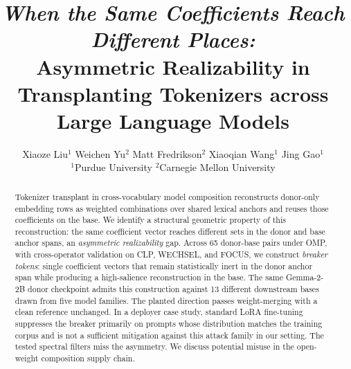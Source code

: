 \documentclass{article}
\title{\textit{When the Same Coefficients Reach Different Places:}\\Asymmetric Realizability in Transplanting Tokenizers across Large Language Models}
\author{%
  Xiaoze Liu$^1$ \quad Weichen Yu$^2$ \quad Matt Fredrikson$^2$ \quad Xiaoqian Wang$^1$ \quad Jing Gao$^1$\\
  $^1$Purdue University \quad $^2$Carnegie Mellon University
}
\theoremstyle{plain}
\theoremstyle{definition}
\theoremstyle{remark}
\begin{document}
\maketitle

\begin{abstract}
Tokenizer transplant in cross-vocabulary model composition reconstructs donor-only embedding rows as weighted combinations over shared lexical anchors and reuses those coefficients on the base. We identify a structural geometric property of this reconstruction: the same coefficient vector reaches different sets in the donor and base anchor spans, an \emph{asymmetric realizability} gap. Across 65 donor-base pairs under OMP, with cross-operator validation on CLP, WECHSEL, and FOCUS, we construct \textit{breaker tokens}: single coefficient vectors that remain statistically inert in the donor anchor span while producing a high-salience reconstruction in the base. The same Gemma-2-2B donor checkpoint admits this construction against 13 different downstream bases drawn from five model families. The planted direction passes weight-merging with a clean reference unchanged. In a deployer case study, standard LoRA fine-tuning suppresses the breaker primarily on prompts whose distribution matches the training corpus and is not a sufficient mitigation against this attack family in our setting. The tested spectral filters miss the asymmetry. We discuss potential misuse in the open-weight composition supply chain.
\end{abstract}











\newpage
\appendix













\end{document}
